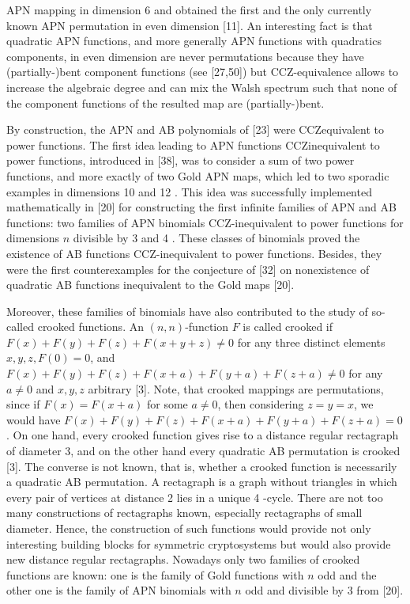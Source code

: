 \documentclass[10pt]{article}
\begin{document}
APN mapping in dimension 6 and obtained the first and the only currently known APN permutation in even dimension [11]. An interesting fact is that quadratic APN functions, and more generally APN functions with quadratics components, in even dimension are never permutations because they have (partially-)bent component functions (see [27,50]) but CCZ-equivalence allows to increase the algebraic degree and can mix the Walsh spectrum such that none of the component functions of the resulted map are (partially-)bent.

By construction, the APN and AB polynomials of [23] were CCZequivalent to power functions. The first idea leading to APN functions CCZinequivalent to power functions, introduced in [38], was to consider a sum of two power functions, and more exactly of two Gold APN maps, which led to two sporadic examples in dimensions 10 and 12 . This idea was successfully implemented mathematically in [20] for constructing the first infinite families of APN and AB functions: two families of APN binomials CCZ-inequivalent to power functions for dimensions $n$ divisible by 3 and 4 . These classes of binomials proved the existence of AB functions CCZ-inequivalent to power functions. Besides, they were the first counterexamples for the conjecture of [32] on nonexistence of quadratic AB functions inequivalent to the Gold maps [20].

Moreover, these families of binomials have also contributed to the study of so-called crooked functions. An $(n, n)$-function $F$ is called crooked if $F(x)+ F(y)+F(z)+F(x+y+z) \neq 0$ for any three distinct elements $x, y, z, F(0)=0$, and $F(x)+F(y)+F(z)+F(x+a)+F(y+a)+F(z+a) \neq 0$ for any $a \neq 0$ and $x, y, z$ arbitrary [3]. Note, that crooked mappings are permutations, since if $F(x)=F(x+a)$ for some $a \neq 0$, then considering $z=y=x$, we would have $F(x)+F(y)+F(z)+F(x+a)+F(y+a)+F(z+a)=0$. On one hand, every crooked function gives rise to a distance regular rectagraph of diameter 3, and on the other hand every quadratic AB permutation is crooked [3]. The converse is not known, that is, whether a crooked function is necessarily a quadratic AB permutation. A rectagraph is a graph without triangles in which every pair of vertices at distance 2 lies in a unique 4 -cycle. There are not too many constructions of rectagraphs known, especially rectagraphs of small diameter. Hence, the construction of such functions would provide not only interesting building blocks for symmetric cryptosystems but would also provide new distance regular rectagraphs. Nowadays only two families of crooked functions are known: one is the family of Gold functions with $n$ odd and the other one is the family of APN binomials with $n$ odd and divisible by 3 from [20].
\end{document}
